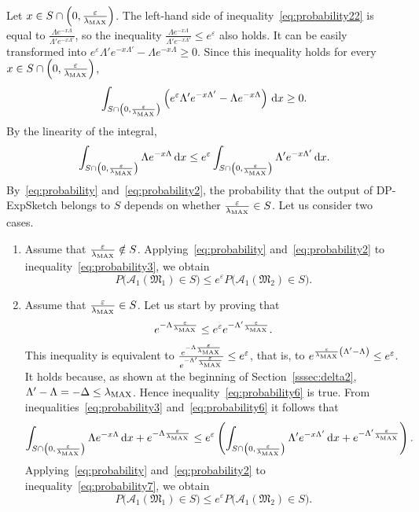 Let $x \in S \cap \left(0, \frac{\varepsilon}{\lambda_{\mathrm{MAX}}}\right)$. The left-hand side of inequality~\eqref{eq:probability22} is equal to $\frac{\Lambda e^{-x\Lambda}}{\Lambda' e^{-x\Lambda'}}$, so the inequality $\frac{\Lambda e^{-x\Lambda}}{\Lambda' e^{-x\Lambda'}} \leq e^{\varepsilon}$ also holds. It can be easily transformed into $e^{\varepsilon} \Lambda' e^{-x\Lambda'} - \Lambda e^{-x\Lambda} \geq 0$. Since this inequality holds for every $x \in S \cap \left(0, \frac{\varepsilon}{\lambda_{\mathrm{MAX}}}\right)$,
\[
\int_{S \cap \left(0, \frac{\varepsilon}{\lambda_{\mathrm{MAX}}}\right)} \left(e^{\varepsilon} \Lambda' e^{-x\Lambda'} - \Lambda e^{-x\Lambda}\right) \,\mathrm{d} x \geq 0.
\]
By the linearity of the integral,
\begin{equation}
\label{eq:probability3}
\int_{S \cap \left(0, \frac{\varepsilon}{\lambda_{\mathrm{MAX}}}\right)} \Lambda e^{-x\Lambda} \,\mathrm{d} x \leq e^{\varepsilon} \int_{S \cap \left(0, \frac{\varepsilon}{\lambda_{\mathrm{MAX}}}\right)} \Lambda' e^{-x\Lambda'} \,\mathrm{d} x.
\end{equation}
By~\eqref{eq:probability} and~\eqref{eq:probability2}, the probability that the output of DP-ExpSketch belongs to $S$ depends on whether $\frac{\varepsilon}{\lambda_{\mathrm{MAX}}} \in S$. Let us consider two cases.
\begin{enumerate}[label=\arabic*.]
\item Assume that $\frac{\varepsilon}{\lambda_{\mathrm{MAX}}} \notin S$. Applying~\eqref{eq:probability} and~\eqref{eq:probability2} to inequality~\eqref{eq:probability3}, we obtain
\[
P\bigl(\mathcal{A}_1(\mathfrak{M}_1) \in S \bigr) \leq e^{\varepsilon} P\bigl(\mathcal{A}_1(\mathfrak{M}_2) \in S \bigr).
\]

\item Assume that $\frac{\varepsilon}{\lambda_{\mathrm{MAX}}} \in S$. Let us start by proving that
\begin{equation}
\label{eq:probability6}
e^{-\Lambda\frac{\varepsilon}{\lambda_{\mathrm{MAX}}}} \leq e^{\varepsilon} e^{-\Lambda'\frac{\varepsilon}{\lambda_{\mathrm{MAX}}}}.
\end{equation}
This inequality is equivalent to $\frac{e^{-\Lambda\frac{\varepsilon}{\lambda_{\mathrm{MAX}}}}}{e^{-\Lambda'\frac{\varepsilon}{\lambda_{\mathrm{MAX}}}}} \leq e^{\varepsilon}$, that is, to $e^{\frac{\varepsilon}{\lambda_{\mathrm{MAX}}}\left(\Lambda' - \Lambda\right)} \leq e^{\varepsilon}$. It holds because, as shown at the beginning of Section~\ref{sssec:delta2}, $\Lambda' - \Lambda = -\Delta \leq \lambda_{\mathrm{MAX}}$. Hence inequality~\eqref{eq:probability6} is true. From inequalities~\eqref{eq:probability3} and~\eqref{eq:probability6} it follows that
\begin{equation}
\label{eq:probability7}
\int_{S \cap \left(0, \frac{\varepsilon}{\lambda_{\mathrm{MAX}}}\right)} \Lambda e^{-x\Lambda} \,\mathrm{d} x + e^{-\Lambda\frac{\varepsilon}{\lambda_{\mathrm{MAX}}}}
  \leq e^{\varepsilon}\left(\int_{S \cap \left(0, \frac{\varepsilon}{\lambda_{\mathrm{MAX}}}\right)} \Lambda' e^{-x\Lambda'} \,\mathrm{d} x + e^{-\Lambda'\frac{\varepsilon}{\lambda_{\mathrm{MAX}}}}\right).
\end{equation}
Applying~\eqref{eq:probability} and~\eqref{eq:probability2} to inequality~\eqref{eq:probability7}, we obtain
\[
P\bigl(\mathcal{A}_1(\mathfrak{M}_1) \in S \bigr) \leq e^{\varepsilon} P\bigl(\mathcal{A}_1(\mathfrak{M}_2) \in S \bigr).
\]
\end{enumerate}

